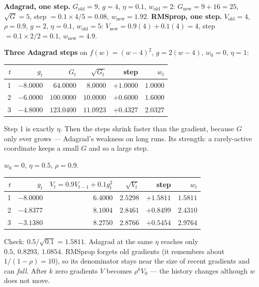 \documentclass[11pt]{article}
\begin{document}
\begin{worked}
\textbf{Adagrad, one step.} $G_{\text{old}} = 9$, $g = 4$, $\eta = 0.1$,
$w_{\text{old}} = 2$: $G_{\text{new}} = 9 + 16 = 25$, $\sqrt{G} = 5$, step
$= 0.1 \times 4/5 = 0.08$, $w_{\text{new}} = 1.92$.
\textbf{RMSprop, one step.} $V_{\text{old}} = 4$, $\rho = 0.9$, $g = 2$,
$\eta = 0.1$, $w_{\text{old}} = 5$: $V_{\text{new}} = 0.9(4) + 0.1(4) = 4$,
step $= 0.1 \times 2/2 = 0.1$, $w_{\text{new}} = 4.9$.

\textbf{Three Adagrad steps} on $f(w) = (w - 4)^2$, $g = 2(w - 4)$, $w_0 = 0$,
$\eta = 1$:
\begin{center}
\begin{tabular}{@{}rrrrrr@{}}
\toprule
$t$ & $g_t$ & $G_t$ & $\sqrt{G_t}$ & step & $w_t$\\ \midrule
1 & $-8.0000$ & $64.0000$ & $8.0000$ & $+1.0000$ & $1.0000$\\
2 & $-6.0000$ & $100.0000$ & $10.0000$ & $+0.6000$ & $1.6000$\\
3 & $-4.8000$ & $123.0400$ & $11.0923$ & $+0.4327$ & $2.0327$\\
\bottomrule
\end{tabular}
\end{center}
Step 1 is exactly $\eta$. Then the steps shrink faster than the gradient,
because $G$ only ever grows --- Adagrad's weakness on long runs. Its
strength: a rarely-active coordinate keeps a small $G$ and so a large step.
\end{worked}

\begin{worked}
$w_0 = 0$, $\eta = 0.5$, $\rho = 0.9$.
\begin{center}
\begin{tabular}{@{}rrrrrr@{}}
\toprule
$t$ & $g_t$ & $V_t = 0.9V_{t-1} + 0.1g_t^2$ & $\sqrt{V_t}$ & step & $w_t$\\ \midrule
1 & $-8.0000$ & $6.4000$ & $2.5298$ & $+1.5811$ & $1.5811$\\
2 & $-4.8377$ & $8.1004$ & $2.8461$ & $+0.8499$ & $2.4310$\\
3 & $-3.1380$ & $8.2750$ & $2.8766$ & $+0.5454$ & $2.9764$\\
\bottomrule
\end{tabular}
\end{center}
Check: $0.5/\sqrt{0.1} = 1.5811$. Adagrad at the same $\eta$ reaches only
$0.5,\ 0.8293,\ 1.0854$. RMSprop forgets old gradients (it remembers about
$1/(1-\rho) = 10$), so its denominator stays near the size of recent
gradients and can \emph{fall}. After $k$ zero gradients $V$ becomes
$\rho^k V_0$ --- the history changes although $w$ does not move.
\end{worked}
\end{document}
